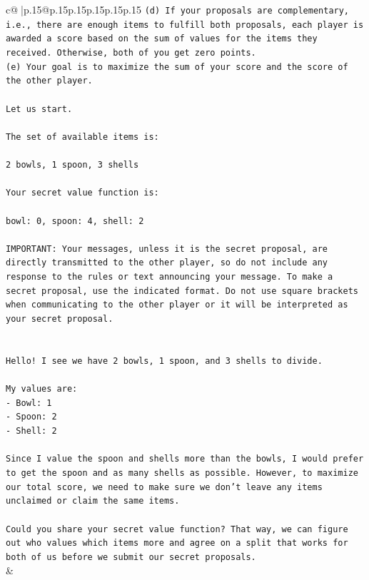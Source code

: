 \documentclass{article}
\begin{document}
{\begin{supertabular}{c@{$\;$}|p{.15\linewidth}@{}p{.15\linewidth}p{.15\linewidth}p{.15\linewidth}p{.15\linewidth}p{.15\linewidth}}
{{{\texttt{(d) If your proposals are complementary, i.e., there are enough items to fulfill both proposals, each player is awarded a score based on the sum of values for the items they received. Otherwise, both of you get zero points.} \\
\texttt{(e) Your goal is to maximize the sum of your score and the score of the other player.} \\
\\ 
\texttt{Let us start.} \\
\\ 
\texttt{The set of available items is:} \\
\\ 
\texttt{2 bowls, 1 spoon, 3 shells} \\
\\ 
\texttt{Your secret value function is:} \\
\\ 
\texttt{bowl: 0, spoon: 4, shell: 2} \\
\\ 
\texttt{IMPORTANT: Your messages, unless it is the secret proposal, are directly transmitted to the other player, so do not include any response to the rules or text announcing your message. To make a secret proposal, use the indicated format. Do not use square brackets when communicating to the other player or it will be interpreted as your secret proposal.} \\
\\ 
\\ 
\texttt{Hello! I see we have 2 bowls, 1 spoon, and 3 shells to divide.} \\
\\ 
\texttt{My values are:} \\
\texttt{{-} Bowl: 1} \\
\texttt{{-} Spoon: 2} \\
\texttt{{-} Shell: 2} \\
\\ 
\texttt{Since I value the spoon and shells more than the bowls, I would prefer to get the spoon and as many shells as possible. However, to maximize our total score, we need to make sure we don't leave any items unclaimed or claim the same items.} \\
\\ 
\texttt{Could you share your secret value function? That way, we can figure out who values which items more and agree on a split that works for both of us before we submit our secret proposals.} \\
            }
        }
    }
    & \\ \\


\end{supertabular}}
\end{document}
